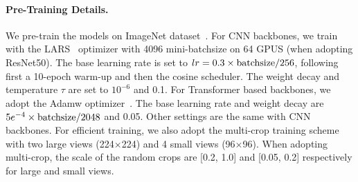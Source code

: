 \documentclass[runningheads]{style/llncs}
\begin{document}
\paragraph{Pre-Training Details.}
We pre-train the models on ImageNet dataset~\cite{imagenet}. For CNN backbones, we train with the LARS~\cite{LARS} optimizer with 4096 mini-batchsize on 64 GPUS (when adopting ResNet50). The base learning rate is set to $lr = 0.3 \times {\rm batchsize} / 256$, following first a 10-epoch warm-up and then the cosine scheduler. The weight decay and temperature $\tau$ are set to $10^{-6}$ and 0.1. For Transformer based backbones, we adopt the Adamw optimizer~\cite{loshchilov2018fixing}. The base learning rate and weight decay are $5e^{-4} \times {\rm batchsize} /2048$ and 0.05. Other settings are the same with CNN backbones. For efficient training, we also adopt the multi-crop training scheme~\cite{swav,dino} with two large views (224$\times$224) and 4 small views (96$\times$96). When adopting multi-crop, the scale of the random crops are [0.2, 1.0] and [0.05, 0.2] respectively for large and small views.
\end{document}
